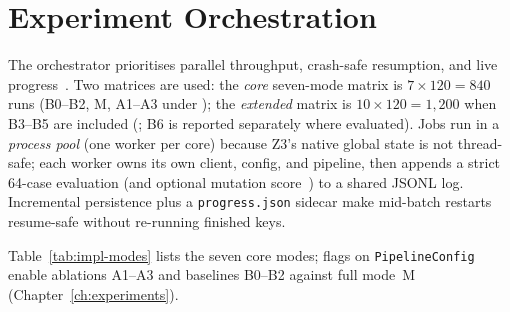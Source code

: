 \section{Experiment Orchestration}
\label{sec:impl:orchestration}

The orchestrator prioritises parallel throughput, crash-safe resumption, and
live progress~\citep{harman2004maff,beck2004xp}.
Two matrices are used: the \emph{core} seven-mode matrix is
$7 \times 120 = 840$ runs (B0--B2, M, A1--A3 under
); the \emph{extended} matrix is
$10 \times 120 = 1{,}200$ when B3--B5 are included
(; B6 is reported separately where evaluated).
Jobs run in a \emph{process pool} (one worker per core) because Z3's native
global state is not thread-safe; each worker owns its own client, config, and
pipeline, then appends a strict 64-case evaluation (and optional mutation
score~\citep{demillo1978mutation,li2023iet_faultprevention}) to a shared JSONL log.
Incremental persistence plus a \texttt{progress.json} sidecar make mid-batch
restarts resume-safe without re-running finished keys.

Table~\ref{tab:impl-modes} lists the seven core modes; flags on
\texttt{PipelineConfig} enable ablations A1--A3 and baselines B0--B2 against
full mode~M (Chapter~\ref{ch:experiments}).

